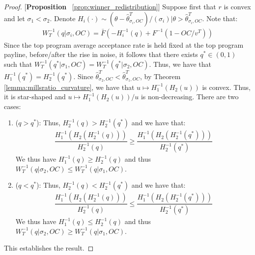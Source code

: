 \begin{proof}{[\textbf{Proposition} ~\ref{prop:winner_redistribution}]}
Suppose first that $r$ is convex and let $\sigma_1<\sigma_2$. Denote $H_i(\cdot)\sim (\theta-\hat{\theta}^T_{\sigma_i,OC})/(\sigma_i)|\theta>\hat{\theta}^T_{\sigma_i,OC}$. Note that:
\begin{align*}
  W_T^{-1}(q|\sigma_i,OC) = \bar{F}\left(-H_{i}^{-1}(q)+F^{-1}(1-OC/v^T)\right)
\end{align*}
Since the top program average acceptance rate is held fixed at the top program payline, before/after the rise in noise, it follows that there exists $q^*\in(0,1)$ such that $W_T^{-1}(q^*|\sigma_1,OC)= W_T^{-1}(q^*|\sigma_2,OC)$. Thus, we have that $H_1^{-1}(q^*) = H_2^{-1}(q^*)$. Since $\hat{\theta}^T_{\sigma_2,OC}<\hat{\theta}^T_{\sigma_1,OC}$, by Theorem \ref{lemma:millsratio_curvature}, we have that $u\mapsto H_1^{-1}(H_2(u))$ is convex. Thus, it is star-shaped and $u\mapsto H_1^{-1}(H_2(u))/u$ is non-decreasing. There are two cases:
\vspace{-5pt}
\begin{enumerate}[label=(\arabic*),ref=\thelemma(\arabic*)]
   \item ($q>q^*$): Thus, $H_2^{-1}(q)>H_2^{-1}(q^*)$ and we have that:
    \begin{align*}
        \dfrac{H_1^{-1}(H_2(H_2^{-1}(q)))}{H_2^{-1}(q)} \geq \dfrac{H_1^{-1}(H_2(H_2^{-1}(q^*)))}{H_2^{-1}(q^*)}
    \end{align*}
    We thus have $H_1^{-1}(q)\geq H_2^{-1}(q)$ and thus $W_T^{-1}(q|\sigma_2,OC)\leq W_T^{-1}(q|\sigma_1,OC)$. 
    \item ($q<q^*$): Thus, $H_2^{-1}(q)<H_2^{-1}(q^*)$ and we have that:
    \begin{align*}
        \dfrac{H_1^{-1}(H_2(H_2^{-1}(q)))}{H_2^{-1}(q)} \leq \dfrac{H_1^{-1}(H_2(H_2^{-1}(q^*)))}{H_2^{-1}(q^*)}
    \end{align*}
    We thus have $H_1^{-1}(q)\leq H_2^{-1}(q)$ and thus $W_T^{-1}(q|\sigma_2,OC)\geq W_T^{-1}(q|\sigma_1,OC)$. 
\end{enumerate}
This establishes the result. 
\end{proof}

